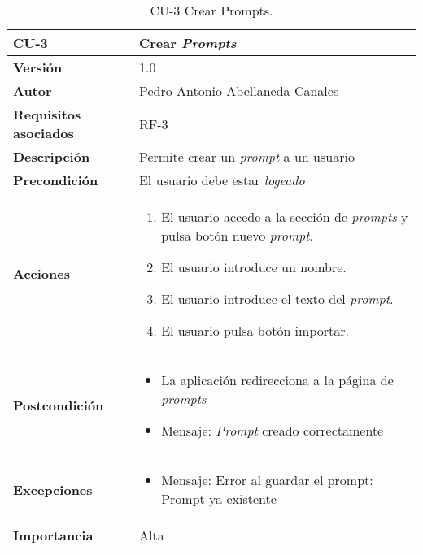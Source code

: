 \begin{table}[p]
	\centering
	\begin{tabularx}{\linewidth}{ p{} p{} }
		\toprule
		\textbf{CU-3}    & \textbf{Crear \textit{Prompts}} \\
		\midrule
		\textbf{Versión}              & 1.0    \\
		\textbf{Autor}                & Pedro Antonio Abellaneda Canales \\
		\textbf{Requisitos asociados} & RF-3 \\
		\textbf{Descripción}          & Permite crear un \textit{prompt} a un usuario \\
		\textbf{Precondición}         & El usuario debe estar \textit{logeado} \\
		\textbf{Acciones}             &
		\begin{enumerate}
			\def\labelenumi{\arabic{enumi}.}
			\tightlist
			\item El usuario accede a la sección de \textit{prompts} y pulsa botón nuevo \textit{prompt}.
            \item El usuario introduce un nombre.
			\item El usuario introduce el texto del \textit{prompt}.
            \item El usuario pulsa botón importar.
		\end{enumerate} \\
		\textbf{Postcondición}        
                                    & 
                                    \begin{itemize} 
                                        \tightlist
                                        \item La aplicación redirecciona a la página de \textit{prompts} 
                                        \item  Mensaje: \textit{Prompt} creado correctamente 
                                    \end{itemize}  
                                    \\ 
		\textbf{Excepciones}          
                                        & 
                                        \begin{itemize}
                                        \tightlist
                                            \item Mensaje: Error al guardar el prompt: Prompt ya existente
                                        \end{itemize}  
                                        \\ 
		\textbf{Importancia}          & Alta \\
		\bottomrule
	\end{tabularx}
	\caption{CU-3 Crear Prompts.}
	\label{tab:CU-3}
\end{table}

